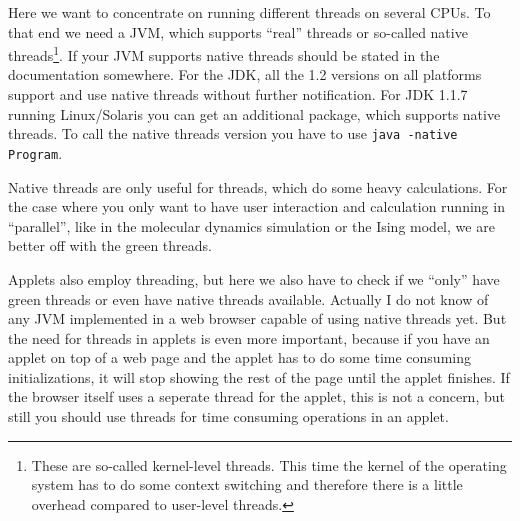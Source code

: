 Here we want to concentrate on running different threads on several CPUs.
To that end we need a JVM, which supports ``real'' threads or so-called
native threads\footnote{These are so-called kernel-level threads. This time the
kernel of the operating system has to do some context switching and
therefore there is a little overhead compared to user-level threads.}. 
If your JVM supports native threads should be stated in the documentation
somewhere. For the JDK, all the 1.2 versions on all platforms support and
use native threads without further notification. For JDK 1.1.7 running
Linux/Solaris you can get an additional package, which supports native
threads. To call the native threads version you have to use
\verb|java -native Program|.

Native threads are only useful for threads, which do some heavy calculations.
For the case where you only want to have user interaction and calculation
running in ``parallel'', like in the molecular dynamics simulation or the
Ising model, we are better off with the green threads. 

Applets also employ threading, but here we also have to check if we
``only'' have green threads or even have native threads available.
Actually I do not know of any JVM implemented in a web browser capable
of using native threads yet. But the need for threads in applets is even
more important, because if you have an applet on top of a web page and
the applet has to do some time consuming initializations, it will stop
showing the rest of the page until the applet finishes. If the browser
itself uses a seperate thread for the applet, this is not a concern, but
still you should use threads for time consuming operations in an applet.

